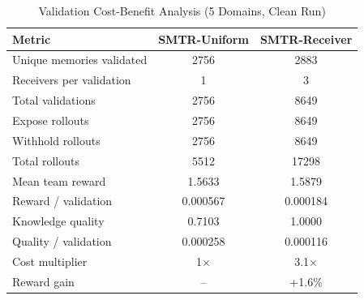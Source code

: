 \begin{table}[t]
\caption{Validation Cost-Benefit Analysis (5 Domains, Clean Run)}
\label{tab:final_receiver3_cost}
\centering
\begin{tabular}{l c c}
\toprule
Metric & SMTR-Uniform & SMTR-Receiver \\
\midrule
Unique memories validated & 2756 & 2883 \\
Receivers per validation & 1 & 3 \\
Total validations & 2756 & 8649 \\
Expose rollouts & 2756 & 8649 \\
Withhold rollouts & 2756 & 8649 \\
Total rollouts & 5512 & 17298 \\
Mean team reward & 1.5633 & 1.5879 \\
Reward / validation & 0.000567 & 0.000184 \\
Knowledge quality & 0.7103 & 1.0000 \\
Quality / validation & 0.000258 & 0.000116 \\
\midrule
Cost multiplier & 1$\times$ & 3.1$\times$ \\
Reward gain & -- & +1.6\% \\
\bottomrule
\end{tabular}
\end{table}
